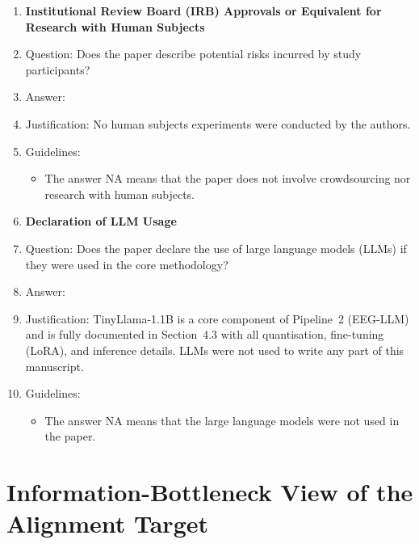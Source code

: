 \documentclass{article}
\begin{document}
\begin{enumerate}
\item {\bf Institutional Review Board (IRB) Approvals or Equivalent for Research with Human Subjects}
    \item[] Question: Does the paper describe potential risks incurred by study participants?
    \item[] Answer: \answerNA{}
    \item[] Justification: No human subjects experiments were conducted by the authors.
    \item[] Guidelines:
    \begin{itemize}
        \item The answer NA means that the paper does not involve crowdsourcing nor research with human subjects.
    \end{itemize}

\item {\bf Declaration of LLM Usage}
    \item[] Question: Does the paper declare the use of large language models (LLMs) if they were used in the core methodology?
    \item[] Answer: \answerYes{}
    \item[] Justification: TinyLlama-1.1B is a core component of Pipeline~2 (EEG-LLM) and is fully documented in Section~4.3 with all quantisation, fine-tuning (LoRA), and inference details. LLMs were not used to write any part of this manuscript.
    \item[] Guidelines:
    \begin{itemize}
        \item The answer NA means that the large language models were not used in the paper.
    \end{itemize}

\end{enumerate}

\appendix

\section{Information-Bottleneck View of the Alignment Target}
\label{app:theory}
\end{document}
